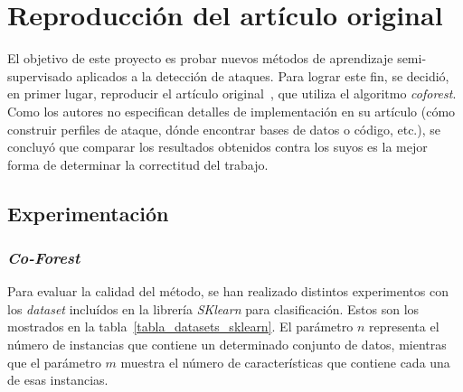 


\section{Reproducción del artículo original}

El objetivo de este proyecto es probar nuevos métodos de aprendizaje semi-supervisado aplicados a la detección de ataques. Para lograr este fin, se decidió, en primer lugar, reproducir el artículo original~\cite{zhou2021SemisupervisedRecommendationAttack}, que utiliza el algoritmo \textit{coforest}. Como los autores no especifican detalles de implementación en su artículo (cómo construir perfiles de ataque, dónde encontrar bases de datos o código, etc.), se concluyó que comparar los resultados obtenidos contra los suyos es la mejor forma de determinar la correctitud del trabajo.

\subsection{Experimentación}

\subsubsection{\textit{Co-Forest}}
Para evaluar la calidad del método, se han realizado distintos experimentos con los \textit{dataset} incluídos en la librería \textit{SKlearn} para clasificación. Estos son los mostrados en la tabla~\ref{tabla_datasets_sklearn}. El parámetro $n$ representa el número de instancias que contiene un determinado conjunto de datos, mientras que el parámetro $m$ muestra el número de características que contiene cada una de esas instancias.

